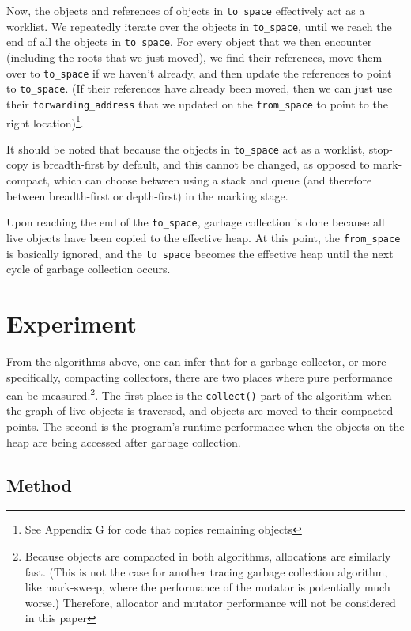 \documentclass[index]{subfiles}
\begin{document}
Now, the objects and references of objects in \verb+to_space+ effectively act as a worklist. We repeatedly iterate over the objects in \verb+to_space+, until we reach the end of all the objects in \verb+to_space+. For every object that we then encounter (including the roots that we just moved), we find their references, move them over to \verb+to_space+ if we haven't already, and then update the references to point to \verb+to_space+. (If their references have already been moved, then we can just use their \verb+forwarding_address+ that we updated on the \verb+from_space+ to point to the right location)\footnote{See Appendix G for code that copies remaining objects}.

It should be noted that because the objects in \verb+to_space+ act as a worklist, stop-copy is breadth-first by default, and this cannot be changed, as opposed to mark-compact, which can choose between using a stack and queue (and therefore between breadth-first or depth-first) in the marking stage.

Upon reaching the end of the \verb+to_space+, garbage collection is done because all live objects have been copied to the effective heap. At this point, the \verb+from_space+ is basically ignored, and the \verb+to_space+ becomes the effective heap until the next cycle of garbage collection occurs.

\section{Experiment}

From the algorithms above, one can infer that for a garbage collector, or more specifically, compacting collectors, there are two places where pure performance can be measured.\footnote{Because objects are compacted in both algorithms, allocations are similarly fast. (This is not the case for another tracing garbage collection algorithm, like mark-sweep, where the performance of the mutator is potentially much worse.) Therefore, allocator and mutator performance will not be considered in this paper}. The first place is the \verb+collect()+ part of the algorithm when the graph of live objects is traversed, and objects are moved to their compacted points. The second is the program's runtime performance when the objects on the heap are being accessed after garbage collection.

\subsection{Method}
\end{document}
